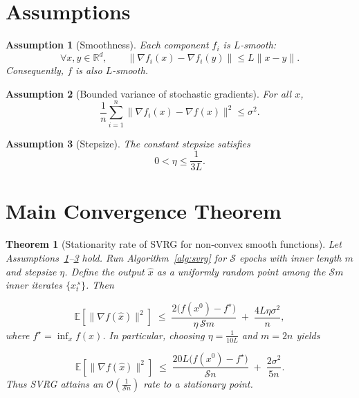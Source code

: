 \documentclass{article}
\newtheorem{theorem}{Theorem}
\newtheorem{assumption}{Assumption}
\newcommand{\E}{\mathbb{E}}
\begin{document}
\section*{Assumptions}
\begin{assumption}[Smoothness]\label{ass:smooth}
Each component \(f_i\) is \(L\)-smooth:
\[
\forall x,y\in\mathbb{R}^{d},\qquad
\|\nabla f_i(x)-\nabla f_i(y)\|\le L\|x-y\|.
\tag{A1}
\]
Consequently,
\(f\) is also \(L\)-smooth.
\end{assumption}

\begin{assumption}[Bounded variance of stochastic gradients]\label{ass:var}
For all \(x\),
\[
\frac1n\sum_{i=1}^{n}\|\nabla f_i(x)-\nabla f(x)\|^2 \le \sigma^2 .
\tag{A2}
\]
\end{assumption}

\begin{assumption}[Stepsize]\label{ass:stepsize}
The constant stepsize satisfies  
\[
0<\eta\le \frac{1}{3L}.
\tag{A3}
\]
\end{assumption}

\section*{Main Convergence Theorem}
\begin{theorem}[Stationarity rate of SVRG for non‑convex smooth functions]\label{thm:svrg}
Let Assumptions~\ref{ass:smooth}--\ref{ass:stepsize} hold.  
Run Algorithm~\ref{alg:svrg} for \(\mathcal{S}\) epochs with inner length \(m\) and stepsize \(\eta\).
Define the output \(\hat{x}\) as a uniformly random point among the
\(\mathcal{S}m\) inner iterates \(\{x_t^{\,s}\}\).  Then

\[
\E\!\left[\|\nabla f(\hat{x})\|^{2}\right]
\;\le\;
\frac{2\bigl(f(x^{0})-f^{\star}\bigr)}{\eta \,\mathcal{S}m}
\;+\;
\frac{4L\eta\sigma^{2}}{n},
\tag{4}
\]
where \(f^{\star}= \inf_{x}f(x)\).  
In particular, choosing \(\eta = \frac{1}{10L}\) and \(m = 2n\) yields  

\[
\E\!\left[\|\nabla f(\hat{x})\|^{2}\right]
\;\le\;
\frac{20L\bigl(f(x^{0})-f^{\star}\bigr)}{\mathcal{S}n}
\;+\;
\frac{2\sigma^{2}}{5n}.
\tag{5}
\]
Thus SVRG attains an \(\mathcal{O}\!\left(\frac{1}{\mathcal{S}n}\right)\) rate to a stationary point.
\end{theorem}
\end{document}
